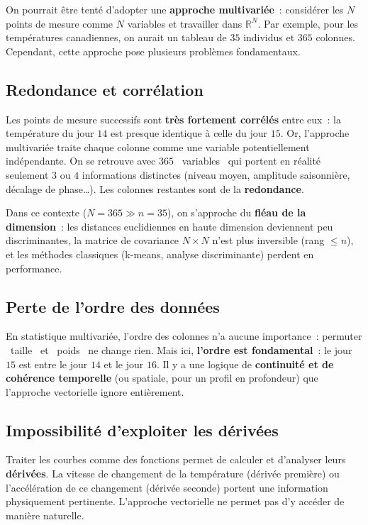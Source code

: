 \documentclass[11pt, a4paper]{article}
\newcommand{\R}{\mathbb{R}}
\begin{document}
On pourrait \^etre tent\'e d'adopter une \textbf{approche multivari\'ee}~: consid\'erer les $N$ points de mesure comme $N$ variables et travailler dans $\R^N$. Par exemple, pour les temp\'eratures canadiennes, on aurait un tableau de $35$ individus et $365$ colonnes. Cependant, cette approche pose plusieurs probl\`emes fondamentaux.

\subsection{Redondance et corr\'elation}

Les points de mesure successifs sont \textbf{tr\`es fortement corr\'el\'es} entre eux~: la temp\'erature du jour $14$ est presque identique \`a celle du jour $15$. Or, l'approche multivari\'ee traite chaque colonne comme une variable potentiellement ind\'ependante. On se retrouve avec $365$ \guillemotleft~variables~\guillemotright{} qui portent en r\'ealit\'e seulement $3$ ou $4$ informations distinctes (niveau moyen, amplitude saisonni\`ere, d\'ecalage de phase\ldots). Les colonnes restantes sont de la \textbf{redondance}.

Dans ce contexte ($N = 365 \gg n = 35$), on s'approche du \textbf{fl\'eau de la dimension}~: les distances euclidiennes en haute dimension deviennent peu discriminantes, la matrice de covariance $N \times N$ n'est plus inversible (rang $\leq n$), et les m\'ethodes classiques (k-means, analyse discriminante) perdent en performance.

\subsection{Perte de l'ordre des donn\'ees}

En statistique multivari\'ee, l'ordre des colonnes n'a aucune importance~: permuter \guillemotleft~taille~\guillemotright{} et \guillemotleft~poids~\guillemotright{} ne change rien. Mais ici, \textbf{l'ordre est fondamental}~: le jour $15$ est entre le jour $14$ et le jour $16$. Il y a une logique de \textbf{continuit\'e et de coh\'erence temporelle} (ou spatiale, pour un profil en profondeur) que l'approche vectorielle ignore enti\`erement.

\subsection{Impossibilit\'e d'exploiter les d\'eriv\'ees}

Traiter les courbes comme des fonctions permet de calculer et d'analyser leurs \textbf{d\'eriv\'ees}. La vitesse de changement de la temp\'erature (d\'eriv\'ee premi\`ere) ou l'acc\'el\'eration de ce changement (d\'eriv\'ee seconde) portent une information physiquement pertinente. L'approche vectorielle ne permet pas d'y acc\'eder de mani\`ere naturelle.
\end{document}
